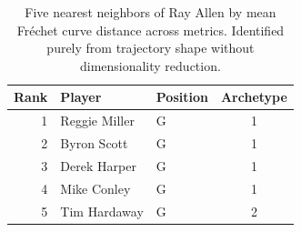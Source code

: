 \begin{table}[htbp]
  \centering\small
  \begin{tabular}{rllc}
    \toprule
    Rank & Player & Position & Archetype \\
    \midrule
    1 & Reggie Miller & G & 1 \\
    2 & Byron Scott & G & 1 \\
    3 & Derek Harper & G & 1 \\
    4 & Mike Conley & G & 1 \\
    5 & Tim Hardaway & G & 2 \\
    \bottomrule
  \end{tabular}
  \caption{Five nearest neighbors of Ray Allen by mean Fr\'{e}chet curve distance across metrics. Identified purely from trajectory shape without dimensionality reduction.}
  \label{tab:Ray_Allen_frechet_curve_neighbors}
\end{table}

